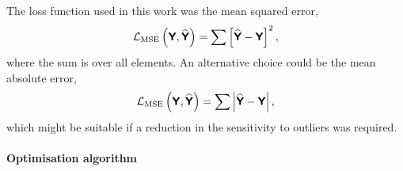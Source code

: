 The loss function used in this work was the mean squared error,
\begin{equation}
\mathcal{L}_\text{MSE} \left( \bm{\mathsf{Y}}, \bm{\mathsf{\widehat{Y}}} \right)
= \sum \left[ \bm{\mathsf{\widehat{Y}}} - \bm{\mathsf{Y}} \right]^2,
\label{ml_Eqn:mse}
\end{equation}
where the sum is over all elements. An alternative choice could be the mean absolute error,
\begin{equation}
\mathcal{L}_\text{MSE} \left( \bm{\mathsf{Y}}, \bm{\mathsf{\widehat{Y}}} \right)
= \sum \left| \bm{\mathsf{\widehat{Y}}} - \bm{\mathsf{Y}} \right|,
\end{equation}
which might be suitable if a reduction in the sensitivity to outliers was required.

\paragraph{Optimisation algorithm}

